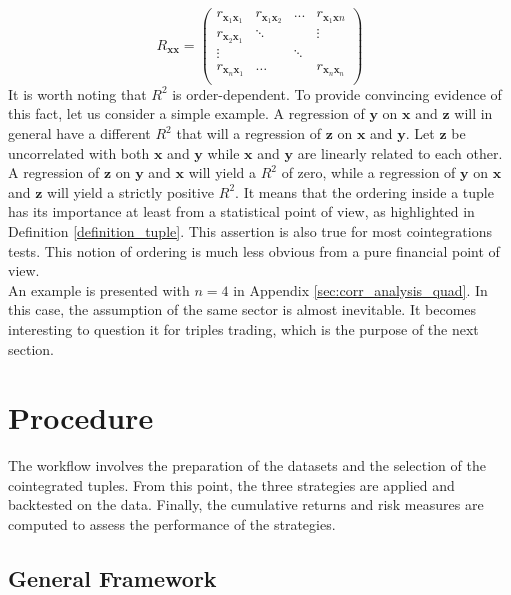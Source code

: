 \documentclass[11pt,a4,twosided,singlespacing,titlepagenumber=on]{scrreprt}
\numberwithin{equation}{chapter} %
\theoremstyle{remark}
\newcommand{\matr}[1]{\mathbf{#1}}
\begin{document}
\begin{equation}
R_{\matr{x}\matr{x}} =\begin{pmatrix}
r_{\matr{x}_1\matr{x}_1}    & r_{\matr{x}_1\matr{x}_2} & ...  & r_{\matr{x}_1\matr{x}n}  \\
r_{\matr{x}_2\matr{x}_1}    & \ddots &   & \vdots  \\
\vdots       &   & \ddots &   \\
r_{\matr{x}_n\matr{x}_1}    & \hdots &   & r_{\matr{x}_n\matr{x}_n} \label{rxx} \\
\end{pmatrix} 
\end{equation}
It is worth noting that $R^2$ is order-dependent. To provide convincing evidence of this fact, let us consider a simple example. A regression of $\matr{y}$ on $\matr{x}$ and $\matr{z}$ will in general have a different $R^2$ that will a regression of $\matr{z}$ on $\matr{x}$ and $\matr{y}$. Let $\matr{z}$ be uncorrelated with both $\matr{x}$ and $\matr{y}$ while $\matr{x}$ and $\matr{y}$ are linearly related to each other. A regression of $\matr{z}$ on $\matr{y}$ and $\matr{x}$ will yield a $R^2$ of zero, while a regression of $\matr{y}$ on $\matr{x}$ and $\matr{z}$ will yield a strictly positive $R^2$. It means that the ordering inside a tuple has its importance at least from a statistical point of view, as highlighted in Definition \ref{definition_tuple}. This assertion is also true for most cointegrations tests. This notion of ordering is much less obvious from a pure financial point of view. \\

An example is presented with $n=4$ in Appendix \ref{sec:corr_analysis_quad}. In this case, the assumption of the same sector is almost inevitable. It becomes interesting to question it for triples trading, which is the purpose of the next section.

\chapter{Procedure}
The workflow involves the preparation of the datasets and the selection of the cointegrated tuples. From this point, the three strategies are applied and backtested on the data. Finally, the cumulative returns and risk measures are computed to assess the performance of the strategies.

\section{General Framework}
\end{document}
